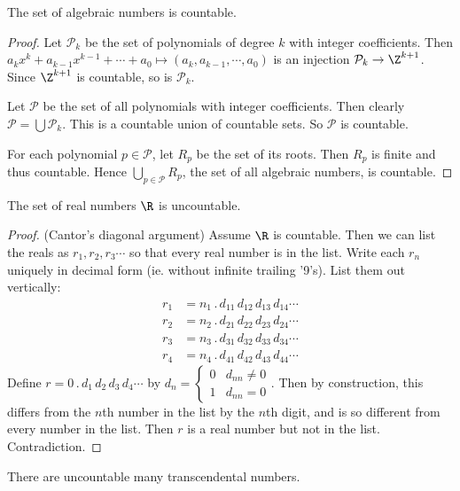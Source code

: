 \documentclass[a4paper]{article}
\begin{document}
\begin{thm}
  The set of algebraic numbers is countable.
\end{thm}
\begin{proof}
  Let $\mathcal{P}_k$ be the set of polynomials of degree $k$ with integer coefficients. Then $a_kx^k + a_{k - 1}x^{k - 1} + \cdots + a_0 \mapsto (a_k, a_{k - 1}, \cdots, a_0)$ is an injection $\mathcal{P}_k \to \Z^{k + 1}$. Since $\Z^{k + 1}$ is countable, so is $\mathcal{P}_k$.

  Let $\mathcal{P}$ be the set of all polynomials with integer coefficients. Then clearly $\mathcal{P} = \bigcup \mathcal{P}_k$. This is a countable union of countable sets. So $\mathcal{P}$ is countable.

  For each polynomial $p \in \mathcal{P}$, let $R_p$ be the set of its roots. Then $R_p$ is finite and thus countable. Hence $\bigcup_{p\in \mathcal{P}} R_p$, the set of all algebraic numbers, is countable.
\end{proof}

\begin{thm}
  The set of real numbers $\R$ is uncountable.
\end{thm}

\begin{proof}
  (Cantor's diagonal argument) Assume $\R$ is countable. Then we can list the reals as $r_1,r_2,r_3\cdots$ so that every real number is in the list. Write each $r_n$ uniquely in decimal form (ie. without infinite trailing '9's). List them out vertically:
  \begin{align*}
    r_1 &= n_1\,.\,d_{11}\,d_{12}\,d_{13}\,d_{14}\cdots\\
    r_2 &= n_2\,.\,d_{21}\,d_{22}\,d_{23}\,d_{24}\cdots\\
    r_3 &= n_3\,.\,d_{31}\,d_{32}\,d_{33}\,d_{34}\cdots\\
    r_4 &= n_4\,.\,d_{41}\,d_{42}\,d_{43}\,d_{44}\cdots
  \end{align*}
  Define $r = 0\,.\,d_1\,d_2\,d_3\,d_4\cdots$ by $d_n =
  \begin{cases}
    0 & d_{nn}\not= 0\\
    1 & d_{nn}=0
  \end{cases}$. Then by construction, this differs from the $n$th number in the list by the $n$th digit, and is so different from every number in the list. Then $r$ is a real number but not in the list. Contradiction.
\end{proof}

\begin{cor}
  There are uncountable many transcendental numbers.
\end{cor}
\end{document}
